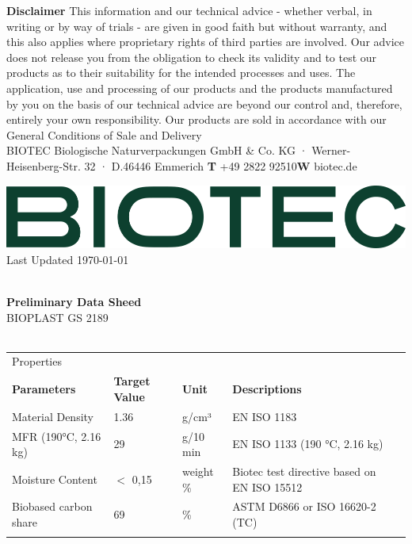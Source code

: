 \documentclass{article}
\begin{document}
\vspace*{\fill}
{\scriptsize
    \textbf{Disclaimer} This information and our technical advice - whether verbal, in writing or by way of trials - are given in good faith but without warranty, and this also applies where proprietary rights of third parties are involved. Our advice does not release you from the obligation to check its validity and to test our products as to their suitability for the intended processes and uses. The application, use and processing of our products and the products manufactured by you on the basis of our technical advice are beyond our control and, therefore, entirely your own responsibility. Our products are sold in accordance with our General Conditions of Sale and Delivery \\
 BIOTEC Biologische Naturverpackungen GmbH \& Co. KG · Werner-Heisenberg-Str. 32 · D.46446 Emmerich \hfill \textbf{T} +49 2822 92510\qquad \textbf{W} biotec.de}
\clearpage
\begin{flushleft}
\includegraphics[scale=0.20]{biotec}
\hfill\tiny Last Updated \today
\end{flushleft}
\begin{flushleft}
\hspace{1cm}\\
\textbf{Preliminary Data Sheed}\\
BIOPLAST GS 2189\\
\hspace{1cm}\\
\end{flushleft}
\begin{center}
\begin{tabularx}
{\textwidth}{X l  l  l  l }\rowcolor{color_title}Properties &  &  &  &  \\
\textbf{Parameters} & \textbf{Target Value} & \textbf{Unit} & \textbf{Descriptions} &  \\
Material Density  & 1.36 & g/cm³ & EN ISO 1183 &  \\
\arrayrulecolor{line_color}\hline
MFR (190°C, 2.16 kg) & 29 & g/10 min & EN ISO 1133 (190 °C, 2.16 kg) &  \\
\arrayrulecolor{line_color}\hline
Moisture Content & \(<\) 0,15 & weight \% & Biotec test directive based on EN ISO 15512 &  \\
\arrayrulecolor{line_color}\hline
Biobased carbon share & 69 & \% & ASTM D6866 or ISO 16620-2 (TC) &  \\
\arrayrulecolor{line_color}\hline

\end{tabularx}
\end{center}
\end{document}

